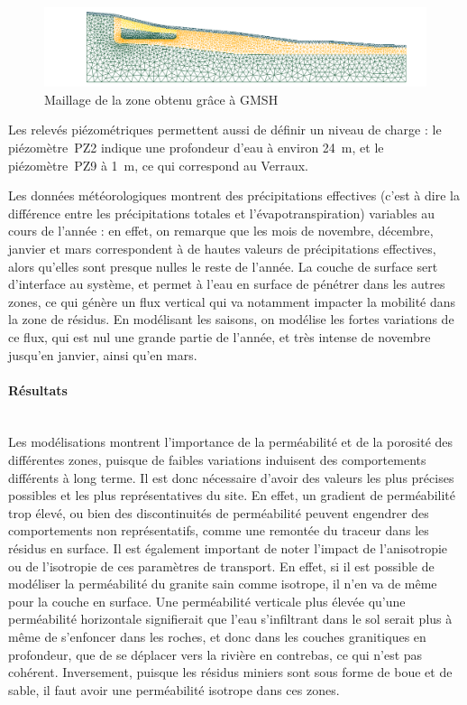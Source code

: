 \documentclass{article}
\begin{document}
\begin{figure}[H]
    \centering
    \includegraphics[width=1.0\linewidth]{III_B_3_4.png}
    \caption{Maillage de la zone obtenu grâce à GMSH}
    \label{maillage_ribiere}
\end{figure}

Les relevés piézométriques permettent aussi de définir un niveau de charge : le piézomètre~PZ2 indique une profondeur d’eau à environ 24~m, et le piézomètre~PZ9 à 1~m, ce qui correspond au Verraux.

Les données météorologiques montrent des précipitations effectives (c’est à dire la différence entre les précipitations totales et l’évapotranspiration) variables au cours de l’année : en effet, on remarque que les mois de novembre, décembre, janvier et mars correspondent à de hautes valeurs de précipitations effectives, alors qu’elles sont presque nulles le reste de l’année. La couche de surface sert d'interface au système, et permet à l'eau en surface de pénétrer dans les autres zones, ce qui génère un flux vertical qui va notamment impacter la mobilité dans la zone de résidus. En modélisant les saisons, on modélise les fortes variations de ce flux, qui est nul une grande partie de l'année, et très intense de novembre jusqu'en janvier, ainsi qu'en mars.

\paragraph{Résultats \\ \\}
Les modélisations montrent l’importance de la perméabilité et de la porosité des différentes zones, puisque de faibles variations induisent des comportements différents à long terme. Il est donc nécessaire d’avoir des valeurs les plus précises possibles et les plus représentatives du site. En effet, un gradient de perméabilité trop élevé, ou bien des discontinuités de perméabilité peuvent engendrer des comportements non représentatifs, comme une remontée du traceur dans les résidus en surface. Il est également important de noter l'impact de l'anisotropie ou de l'isotropie de ces paramètres de transport. En effet, si il est possible de modéliser la perméabilité du granite sain comme isotrope, il n'en va de même pour la couche en surface. Une perméabilité verticale plus élevée qu'une perméabilité horizontale signifierait que l'eau s'infiltrant dans le sol serait plus à même de s'enfoncer dans les roches, et donc dans les couches granitiques en profondeur, que de se déplacer vers la rivière en contrebas, ce qui n'est pas cohérent. Inversement, puisque les résidus miniers sont sous forme de boue et de sable, il faut avoir une perméabilité isotrope dans ces zones.
\end{document}
